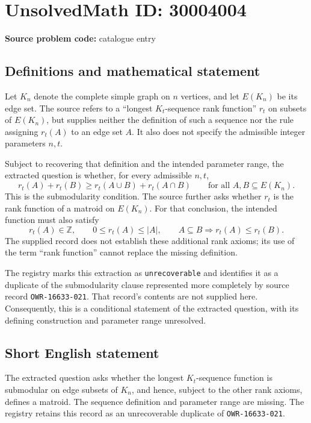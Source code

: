 \documentclass[11pt]{article}
\newcommand{\Z}{\mathbb{Z}}
\begin{document}
\section*{UnsolvedMath ID: 30004004}
\textbf{Source problem code:} catalogue entry
\subsection{Definitions and mathematical statement}
Let \(K_n\) denote the complete simple graph on \(n\) vertices, and let \(E(K_n)\) be its edge set. The source refers to a ``longest \(K_t\)-sequence rank function'' \(r_t\) on subsets of \(E(K_n)\), but supplies neither the definition of such a sequence nor the rule assigning \(r_t(A)\) to an edge set \(A\). It also does not specify the admissible integer parameters \(n,t\).

Subject to recovering that definition and the intended parameter range, the extracted question is whether, for every admissible \(n,t\),
\[
 r_t(A)+r_t(B)\ge r_t(A\cup B)+r_t(A\cap B)
 \qquad\text{for all }A,B\subseteq E(K_n).
\]
This is the submodularity condition. The source further asks whether \(r_t\) is the rank function of a matroid on \(E(K_n)\). For that conclusion, the intended function must also satisfy
\[
 r_t(A)\in\Z,\qquad 0\le r_t(A)\le |A|,
 \qquad A\subseteq B\Longrightarrow r_t(A)\le r_t(B).
\]
The supplied record does not establish these additional rank axioms; its use of the term ``rank function'' cannot replace the missing definition.

The registry marks this extraction as \texttt{unrecoverable} and identifies it as a duplicate of the submodularity clause represented more completely by source record \texttt{OWR-16633-021}. That record's contents are not supplied here. Consequently, this is a conditional statement of the extracted question, with its defining construction and parameter range unresolved.
\subsection{Short English statement}
The extracted question asks whether the longest \(K_t\)-sequence function is submodular on edge subsets of \(K_n\), and hence, subject to the other rank axioms, defines a matroid. The sequence definition and parameter range are missing. The registry retains this record as an unrecoverable duplicate of \texttt{OWR-16633-021}.
\end{document}
